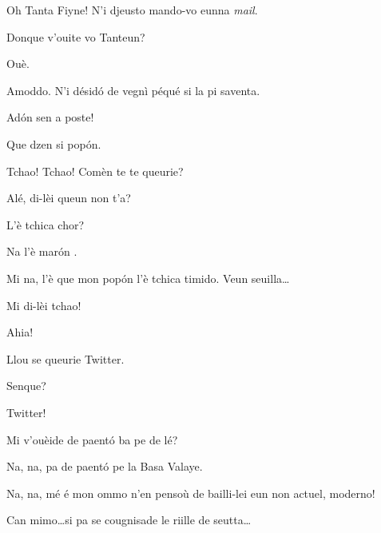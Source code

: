 \begin{drama}
\Tanteunspeaks{} Oh Tanta Fiyne! N'i djeusto mando-vo eunna \textit{mail}.

\Tantaspeaks Donque v'ouite vo Tanteun?

\Tanteunspeaks Ouè.

\Tantaspeaks Amoddo. N'i désid\'o de vegnì péqué si la pi saventa.

\Tanteunspeaks Ad\'on sen a poste!


\Tantaspeaks{} Que dzen si pop\'on.


\Tantaspeaks Tchao!  Tchao! Comèn te te queurie?


\Alicespeaks{} Alé, di-lèi queun non t'a?


\Tantaspeaks L'è tchica chor?

\Tanteunspeaks Na l'è mar\'on .

\Alicespeaks Mi na, l'è que mon pop\'on l'è tchica timido.  Veun seuilla\ldots


\Tanteunspeaks{} Mi di-lèi tchao!


\Twitterspeaks Ahia!

\Alicespeaks{} Llou se queurie Twitter.

\Tantaspeaks{} Senque? 

\Alicespeaks Twitter!

\Tantaspeaks Mi v'ouèide de paent\'o ba pe de lé?

\Tanteunspeaks Na, na, pa de paent\'o pe la Basa Valaye.

\Alicespeaks Na, na, mé é mon ommo n’en pensoù de bailli-lei eun non actuel, moderno!

\Tantaspeaks Can mimo\ldots si pa se cougnisade le riille de seutta\ldots



\end{drama}
